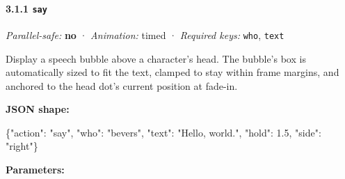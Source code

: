 \documentclass[
  11pt,
]{book}
\newenvironment{Shaded}{}{}
\newcommand{\DataTypeTok}[1]{\textcolor[rgb]{0.56,0.13,0.00}{#1}}
\newcommand{\FloatTok}[1]{\textcolor[rgb]{0.25,0.63,0.44}{#1}}
\newcommand{\FunctionTok}[1]{\textcolor[rgb]{0.02,0.16,0.49}{#1}}
\newcommand{\StringTok}[1]{\textcolor[rgb]{0.25,0.44,0.63}{#1}}
\begin{document}
\paragraph{\texorpdfstring{3.1.1 \texttt{say}}{3.1.1 say}}\label{say}

\emph{Parallel-safe:} \textbf{no} · \emph{Animation:} timed ·
\emph{Required keys:} \texttt{who}, \texttt{text}

Display a speech bubble above a character's head. The bubble's box is
automatically sized to fit the text, clamped to stay within frame
margins, and anchored to the head dot's current position at fade-in.

\textbf{JSON shape:}

\begin{Shaded}
\begin{Highlighting}[]
\FunctionTok{\{}\DataTypeTok{"action"}\FunctionTok{:} \StringTok{"say"}\FunctionTok{,} \DataTypeTok{"who"}\FunctionTok{:} \StringTok{"bevers"}\FunctionTok{,} \DataTypeTok{"text"}\FunctionTok{:} \StringTok{"Hello, world."}\FunctionTok{,}
 \DataTypeTok{"hold"}\FunctionTok{:} \FloatTok{1.5}\FunctionTok{,} \DataTypeTok{"side"}\FunctionTok{:} \StringTok{"right"}\FunctionTok{\}}
\end{Highlighting}
\end{Shaded}

\textbf{Parameters:}
\end{document}
